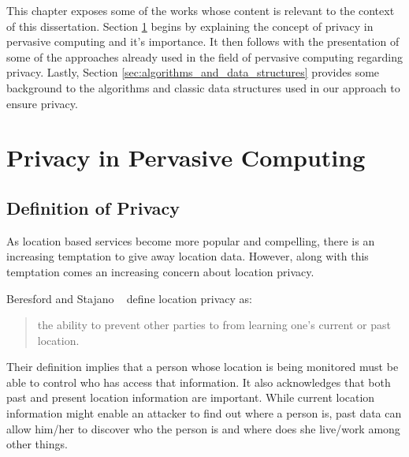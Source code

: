 This chapter exposes some of the works whose content is relevant to
the context of this dissertation. Section
\ref{sec:privacy_pervasive_computing} begins by explaining the concept
of privacy in pervasive computing and it's importance. It then follows
with the presentation of some of the approaches already used in the
field of pervasive computing regarding privacy. Lastly, Section
\ref{sec:algorithms_and_data_structures} provides some background to
the algorithms and classic data structures used in our approach to ensure
privacy.

\section{Privacy in Pervasive Computing}
\label{sec:privacy_pervasive_computing}

\subsection{Definition of Privacy}
\label{sec:definition_privacy}

As location based services become more popular and compelling, there
is an increasing temptation to give away location data. However, along
with this temptation comes an increasing concern about location privacy.

Beresford and Stajano ~\cite{1186725} define location privacy as:
\begin{quotation}
  the ability to prevent other parties to from learning one's
  current or past location.
\end{quotation}
Their definition implies that a person whose location is being
monitored must be able to control who has access that information.
It also acknowledges that both past and present location information
are important. While current location information might enable an
attacker to find out where a person is, past data can allow him/her to
discover who the person is and  where does she live/work among other
things.

